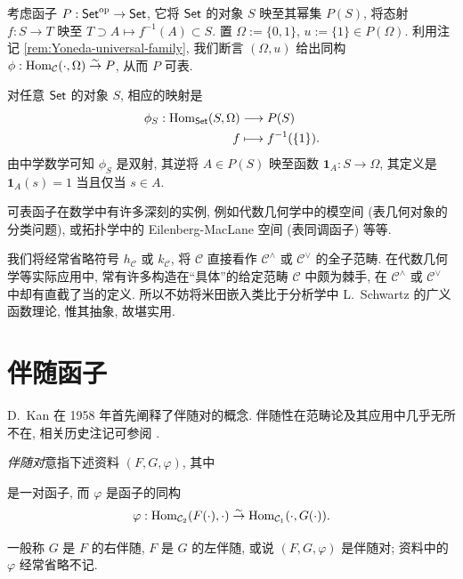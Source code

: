 \begin{example}
	考虑函子 $P: \mathsf{Set}^\text{op} \to \mathsf{Set}$, 它将 $\mathsf{Set}$ 的对象 $S$ 映至其幂集 $P(S)$, 将态射 $f: S \to T$ 映至 $T \supset A \mapsto f^{-1}(A) \subset S$. 置 $\Omega := \{0, 1\}$, $u := \{1\} \in P(\Omega)$. 利用注记 \ref{rem:Yoneda-universal-family}, 我们断言 $(\Omega, u)$ 给出同构 $ \phi: \operatorname{Hom}_{\mathcal{C}}(\cdot, \Omega) \stackrel{\sim}{\rightarrow} P$, 从而 $P$ 可表.

	对任意 $\mathsf{Set}$ 的对象 $S$, 相应的映射是
	\begin{align*}
		\phi_S: \operatorname{Hom}_{\mathsf{Set}}(S, \Omega) & \longrightarrow P(S) \\
		f & \longmapsto f^{-1}(\{1\}).
	\end{align*}
	由中学数学可知 $\phi_S$ 是双射, 其逆将 $A \in P(S)$ 映至函数 $\mathbf{1}_A:  S \to \Omega$, 其定义是 $\mathbf{1}_A (s)=1$ 当且仅当 $s \in A$.
\end{example}
可表函子在数学中有许多深刻的实例, 例如代数几何学中的模空间 (表几何对象的分类问题), 或拓扑学中的 Eilenberg-MacLane 空间 (表同调函子) 等等.

我们将经常省略符号 $h_{\mathcal{C}}$ 或 $k_{\mathcal{C}}$, 将 $\mathcal{C}$ 直接看作 $\mathcal{C}^\wedge$ 或 $\mathcal{C}^\vee$ 的全子范畴. 在代数几何学等实际应用中, 常有许多构造在``具体''的给定范畴 $\mathcal{C}$ 中颇为棘手, 在 $\mathcal{C}^\wedge$ 或 $\mathcal{C}^\vee$ 中却有直截了当的定义. 所以不妨将米田嵌入类比于分析学中 L.\ Schwartz 的广义函数理论, 惟其抽象, 故堪实用.

\section{伴随函子}\label{sec:adjoint-functor}
D.\ Kan 在 1958 年首先阐释了伴随对的概念. 伴随性在范畴论及其应用中几乎无所不在, 相关历史注记可参阅 \cite[p.107]{ML98}.
\begin{definition}\label{def:adjunction-pair} 
	\emph{伴随对}意指下述资料 $(F, G, \varphi)$, 其中
	是一对函子, 而 $\varphi$ 是函子的同构
	\[ \varphi: \operatorname{Hom}_{\mathcal{C}_2}(F(\cdot), \cdot) \stackrel{\sim}{\rightarrow} \operatorname{Hom}_{\mathcal{C}_1}(\cdot, G(\cdot)). \]
\end{definition}
一般称 $G$ 是 $F$ 的右伴随, $F$ 是 $G$ 的左伴随, 或说 $(F, G, \varphi)$ 是伴随对; 资料中的 $\varphi$ 经常省略不记.

